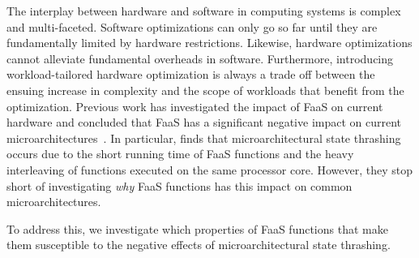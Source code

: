 \documentclass[../main.tex]{subfiles}
\begin{document}
\begin{refsection}
The interplay between hardware and software in computing systems is
complex and multi-faceted. Software optimizations can only go so far
until they are fundamentally limited by hardware
restrictions. Likewise, hardware optimizations cannot alleviate
fundamental overheads in software. Furthermore, introducing
workload-tailored hardware optimization is always a trade off between
the ensuing increase in complexity and the scope of workloads that
benefit from the optimization. Previous work has investigated the
impact of FaaS on current hardware and concluded that FaaS has a
significant negative impact on current
microarchitectures~\cite{shahrad19_archit_implic_funct_servic_comput,lukewarm_serverless}. In
particular, \textcite{lukewarm_serverless} finds that
microarchitectural state thrashing occurs due to the short running
time of FaaS functions and the heavy interleaving of functions
executed on the same processor core. However, they stop short of investigating \emph{why} FaaS
functions has this impact on common microarchitectures.

To address this, we investigate which properties of FaaS functions
that make them susceptible to the negative effects of
microarchitectural state thrashing.




\end{refsection}
\end{document}
